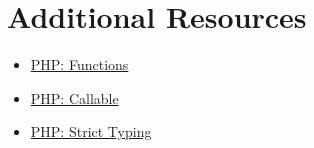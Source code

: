 \section{Additional Resources}

\begin{itemize}[leftmargin=*]
    \item \href{http://www.php.net/manual/en/functions.user-defined.php}{PHP: Functions}
    \item \href{http://www.php.net/manual/en/language.types.callable.php}{PHP: Callable}
    \item \href{http://www.php.net/manual/en/functions.arguments.php#functions.arguments.type-declaration.strict}{PHP: Strict Typing}
\end{itemize}
